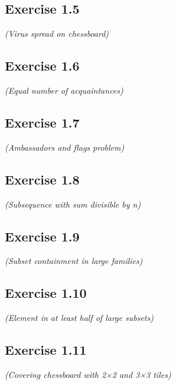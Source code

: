 \documentclass[12pt,a4paper]{article}
\begin{document}
\subsection*{Exercise 1.5}
\textit{(Virus spread on chessboard)}

\vspace{1cm}

\subsection*{Exercise 1.6}
\textit{(Equal number of acquaintances)}

\vspace{1cm}

\subsection*{Exercise 1.7}
\textit{(Ambassadors and flags problem)}

\vspace{1cm}

\subsection*{Exercise 1.8}
\textit{(Subsequence with sum divisible by n)}

\vspace{1cm}

\subsection*{Exercise 1.9}
\textit{(Subset containment in large families)}

\vspace{1cm}

\subsection*{Exercise 1.10}
\textit{(Element in at least half of large subsets)}

\vspace{1cm}

\subsection*{Exercise 1.11}
\textit{(Covering chessboard with 2×2 and 3×3 tiles)}
\end{document}
